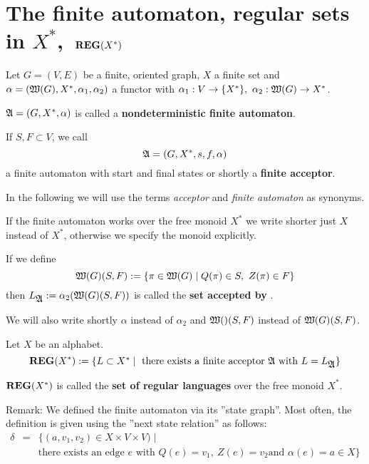 \section{The finite automaton, regular sets in $X^*$,\ $\mbox{{\bf REG}}(X^*)$}

Let $G = (V, E)$ be a finite, oriented graph, $X$ a finite set and $\alpha =
(\mbox{$\mathfrak{W}(G)$}, X^*,\alpha_1, \alpha_2)$ a functor with $\alpha_1 : V \to
\mbox{$\{X^*\}$},\ \alpha_2 : \mbox{$\mathfrak{W}(G)$} \to X^*$.

\begin{definition}
$\mbox{$\mathfrak{A}$} = (G, X^*, \alpha)$ is called a {\bf nondeterministic finite
automaton}.
\end{definition}


If $S, F \subset V$, we call 
\[ \mbox{$\mathfrak{A}$} = (G, X^*, s, f, \alpha) \]
a finite automaton with start and final states or shortly a {\bf finite
acceptor}.

In the following we will use the terms {\em acceptor} and {\em finite automaton}
as synonyms.

If the finite automaton works over the free monoid $X^*$ we write shorter just
$X$ instead of $X^*$, otherwise we specify the monoid explicitly.

If we define 
\[ \mbox{$\mathfrak{W}(G)$}(S, F) := \mbox{$\{\pi \in \mbox{$\mathfrak{W}(G)$} \mid Q(\pi) \in S,\ Z(\pi)
\in F\}$}
\] 
then $L_{\mbox{$\mathfrak{A}$}} := \alpha_2(\mbox{$\mathfrak{W}(G)$}(S, F))$ is called the {\bf set accepted
by} .

We will also write shortly $\alpha$ instead of $\alpha_2$ and $\mbox{$\mathfrak{W}()$}(S,F)$
instead of $\mbox{$\mathfrak{W}(G)$}(S,F)$.

\begin{definition}
Let $X$ be an alphabet. 
\[ \mbox{{\bf REG}}(X^*) := \mbox{$\{L \subset X^* \mid \mbox{ there exists a finite acceptor
}\mbox{$\mathfrak{A}$} \mbox{ with } L = L_{\mbox{$\mathfrak{A}$}}\}$} \]

$\mbox{{\bf REG}}(X^*)$ is called the {\bf set of regular languages} over the free monoid
$X^*$.
\end{definition}

Remark: We defined the finite automaton via its ''state graph''. Most
often, the definition is given using the ''next state relation'' as follows:
\begin{eqnarray*}
\delta &=& \{(a, v_1, v_2) \in X \times V \times V) \mid \\
&& \mbox{there exists an edge } e \mbox{ with } Q(e) = v_1,\ Z(e) = v_2 \mbox{
and } \alpha(e) = a \in X \}
\end{eqnarray*}

